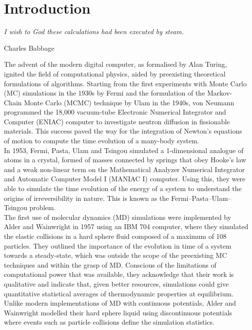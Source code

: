 \chapter{Introduction}\label{Motivation}
%
\epigraph{\textit{I wish to God these calculations had been executed by steam.}}{Charles Babbage}
The advent of the modern digital computer, as formalised by Alan Turing,\cite{Turing1937} ignited the field of computational physics, aided by preexisting theoretical formulations of algorithms. Starting from the first experiments with Monte Carlo (MC) simulations in the 1930s by Fermi and the formulation of the Markov-Chain Monte Carlo (MCMC) technique by Ulam in the 1940s, von Neumann programmed the 18,000 vacuum-tube Electronic Numerical Integrator and Computer (ENIAC) computer to investigate neutron diffusion in fissionable materials.\cite{metropolis1987beginning} This success paved the way for the integration of Newton's equations of motion to compute the time evolution of a many-body system.\\

In 1953, Fermi, Pasta, Ulam and Tsingou simulated a 1-dimensional analogue of atoms in a crystal, formed of masses connected by springs that obey Hooke's law and a weak non-linear term on the Mathematical Analyzer Numerical Integrator and Automatic Computer Model I (MANIAC I) computer. Using this, they were able to simulate the time evolution of the energy of a system to understand the origins of irreversibility in nature. This is known as the Fermi–Pasta–Ulam–Tsingou problem.\cite{fermi1955studies}\\

The first use of molecular dynamics (MD) simulations were implemented by Alder and Wainwright in 1957 using an IBM 704 computer, where they simulated the elastic collisions in a hard sphere fluid composed of a maximum of 108 particles. They outlined the importance of the evolution in time of a system towards a steady-state, which was outside the scope of the preexisting MC techniques and within the grasp of MD. Conscious of the limitations of computational power that was available, they acknowledge that their work is qualitative and indicate that, given better resources, simulations could give quantitative statistical averages of thermodynamic properties at equilibrium. Unlike modern implementations of MD with continuous potentials, Alder and Wainwright modelled their hard sphere liquid using discontinuous potentials where events such as particle collisions define the simulation statistics.\cite{Alder1959}\\

